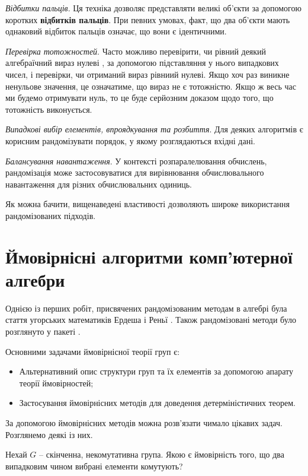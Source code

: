 \textit{Відбитки пальців}. Ця техніка дозволяє представляти великі об'єкти за допомогою коротких \textbf{відбитків пальців}. При певних умовах, факт, що два об'єкти мають однаковий відбиток пальців означає, що вони є ідентичними.

\textit{Перевірка тотожностей}. Часто можливо перевірити, чи рівний деякий алгебраїчний вираз нулеві , за допомогою підставляння у нього випадкових чисел, і перевірки, чи отриманий вираз рівниий нулеві. Якщо хоч раз виникне ненульове значення, це означатиме, що вираз не є тотожністю. Якщо ж весь час ми будемо отримувати нуль, то це буде серйозним доказом щодо того, що тотожність виконується.

\textit{Випадкові вибір елементів, впроядкування та розбиття}. Для деяких алгоритмів є корисним рандомізувати порядок, у якому розглядаються вхідні дані. 

\textit{Балансування навантаження}. У контексті розпаралелювання обчислень, рандомізація може застосовуватися для вирівнювання обчислювального навантаження для різних обчислювальних одиниць.

Як можна бачити, вищенаведені властивості дозволяють широке використання рандомізованих підходів.

\section{Ймовірнісні алгоритми комп'ютерної алгебри}
\label{section.2.2}

Однією із перших робіт, присвячених рандомізованим методам в алгебрі була стаття угорських математиків Ердеша і Реньї \cite{erdos65}. Також рандомізовані методи було розглянуто у пакеті \cite{laver20}.

Основними задачами ймовірнісної теорії груп є:

\begin{itemize}[noitemsep,partopsep=0pt,topsep=0pt,parsep=0pt]
\item Альтернативний опис структури груп та їх елементів за допомогою апарату теорії ймовірностей;
\item Застосування ймовірнісних методів для доведення детерміністичних теорем.
\end{itemize} 

За допомогою ймовірнісних методів можна розв'язати чимало цікавих задач. Розглянемо деякі із них.

Нехай $G$ -- скінченна, некомутативна група. Якою є ймовірність того, що два випадковим чином вибрані елементи комутують?

